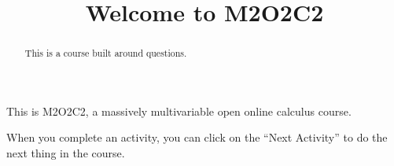 \documentclass{ximera}
\title{Welcome to M2O2C2}
\begin{document}
\begin{abstract}
  This is a course built around questions.
\end{abstract}

This is M2O2C2, a massively multivariable open online calculus course.

When you complete an activity, you can click on the ``Next Activity'' to do the next thing in the course.
\end{document}
